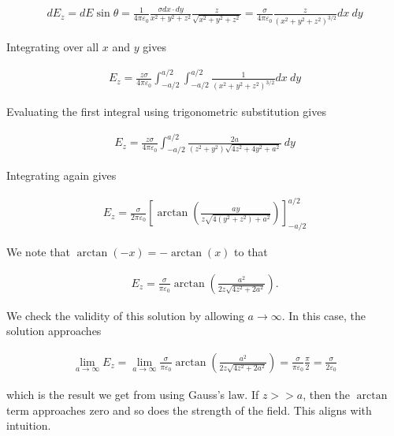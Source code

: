 \documentclass{article}
\begin{document}
\begin{align*}
    dE_z = dE \sin\theta = \frac{1}{4\pi\varepsilon_0}\frac{\sigma dx\cdot dy}{x^2 + y^2 + z^2} \frac{z}{\sqrt{x^2 + y^2 + z^2}} = \frac{\sigma}{4\pi\varepsilon_0}\frac{z}{(x^2 + y^2 + z^2)^{3/2}}dx \ dy
\end{align*}

Integrating over all $x$ and $y$ gives 

\begin{align*}
    E_z = \frac{z\sigma}{4\pi\varepsilon_0}\int_{-a/2}^{a/2} \int_{-a/2}^{a/2} \frac{1}{(x^2 + y^2 + z^2)^{3/2}}dx \ dy
\end{align*}

Evaluating the first integral using trigonometric substitution gives 

\begin{align*}
    E_z = \frac{z\sigma}{4\pi\varepsilon_0}\int_{-a/2}^{a/2} \frac{2a}{\left(z^{2} + y^{2}\right) \sqrt{4z^{2} + 4y^{2} + a^{2}}}\ dy
\end{align*}

Integrating again gives 

\begin{align*}
    E_z = \frac{\sigma}{2\pi\varepsilon_0} \left[\arctan\left(\frac{ay}{z \sqrt{4 \left(y^{2} + z^{2}\right) + a^{2}}}\right)\right]^{a/2}_{-a/2}
\end{align*}

We note that $\arctan(-x) = -\arctan(x)$ to that 

\begin{align*}
    E_z = \frac{\sigma}{\pi \varepsilon_0}\arctan\left(\frac{a^2}{2z \sqrt{4 z^{2} + 2a^{2}}}\right).
\end{align*}

We check the validity of this solution by allowing $a \rightarrow \infty$. In this case, the solution approaches

\begin{align*}
    \lim_{a \rightarrow \infty} E_z = \lim_{a \rightarrow \infty} \frac{\sigma}{\pi \varepsilon_0}\arctan\left(\frac{a^2}{2z \sqrt{4 z^{2} + 2a^{2}}}\right) = \frac{\sigma}{\pi\varepsilon_0}\frac{\pi}{2} = \frac{\sigma}{2\varepsilon_0}
\end{align*}

which is the result we get from using Gauss's law. If $z >> a$, then the $\arctan$ term approaches zero and so does the strength of the field. This aligns with intuition. 


\newpage
\end{document}
